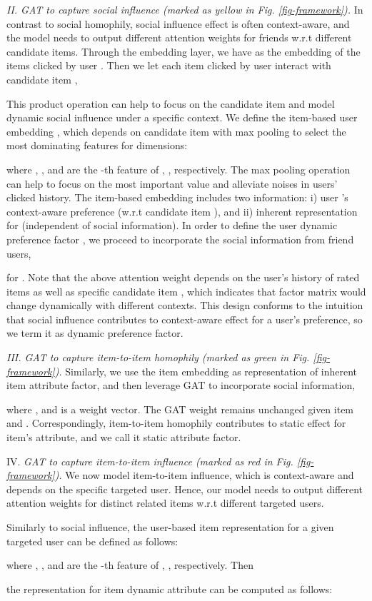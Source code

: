 \documentclass[sigconf]{acmart}
\begin{document}
\emph{II. GAT to capture social influence (marked as yellow in Fig. \ref{fig-framework}).} 
In contrast to social homophily, social influence effect is often context-aware, and the model needs to output different attention weights for friends w.r.t different candidate items. 
Through the embedding layer, we have  as the embedding of {the items clicked by} user .
Then we let each item clicked by user  interact with candidate item , 

This product operation can help to focus on the candidate item and model dynamic social influence under a specific context. 
{We define the item-based user embedding , which depends on candidate item  with max pooling}
to select the most dominating features for  dimensions:

   {where} , , {and}  are the -th feature of , ,  respectively. 
The max pooling operation can help to focus on the most important value and alleviate noises in users' clicked history. {The item-based embedding  includes two information}: i) user 's context-aware preference (w.r.t candidate item ), and ii) inherent representation for  (independent of social information). 
{In order to define the user dynamic preference factor ,}
we proceed to incorporate the social information from friend users,


for .
Note that the above attention weight  depends on the user's history of rated items as well as specific candidate item , which indicates that factor matrix  would change dynamically with  different contexts. This design conforms to the intuition that social influence contributes to context-aware effect for a user's preference, so we term it as dynamic preference factor.

\emph{III. GAT to capture item-to-item homophily (marked as green in Fig. \ref{fig-framework}).} Similarly, we use the item embedding  as representation of inherent item attribute factor, and then leverage GAT to incorporate social information,


where , and  is a weight vector. The GAT weight  remains unchanged given item  and . Correspondingly, item-to-item homophily contributes to static effect for item's attribute, and we call it static attribute factor.

IV. \emph{GAT to capture item-to-item influence (marked as red in Fig. \ref{fig-framework}).} We now model item-to-item influence, which is context-aware and {depends on the} specific targeted user. Hence, our model needs to output different attention weights for distinct related items w.r.t different targeted users. 
{Similarly to social influence, the user-based item representation  for a given targeted user   can be defined as follows: 


where , , {and}  are the -th feature of , ,  respectively.
Then} the representation for item dynamic attribute  can be computed as follows:
\end{document}
